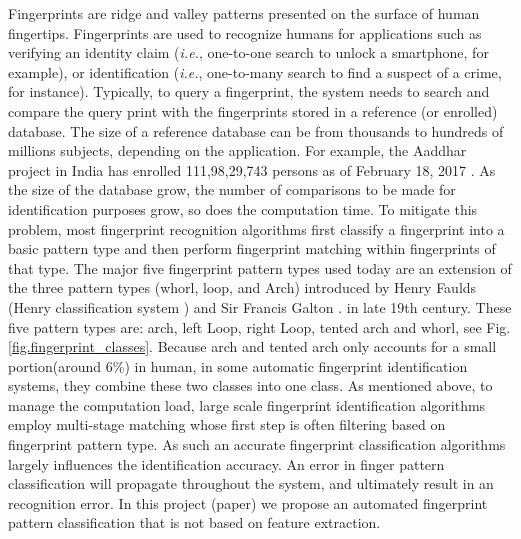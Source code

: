 

Fingerprints are ridge and valley patterns presented on the surface of human fingertips.
%
Fingerprints are used to recognize humans for applications such as verifying an identity claim (\textit{i.e.}, one-to-one search to  unlock a smartphone, for example), or identification (\textit{i.e.}, one-to-many search to find a suspect of a crime, for instance).
%
Typically, to query a fingerprint, the system needs to search and compare the query print with the fingerprints stored in a reference (or enrolled) database.  The size of a reference database can be from thousands to hundreds of millions subjects, depending on the application. For example, the Aaddhar project in India has enrolled 111,98,29,743 persons as of February 18, 2017 \cite{aaddhar}. 
%
As the size of the database grow, the number of comparisons to be made for identification purposes grow, so does the computation time.
%
To mitigate this problem, most fingerprint recognition algorithms first classify a fingerprint into a basic pattern type and then perform fingerprint matching within fingerprints of that type.
%
The major five fingerprint pattern types used today are an extension of the three pattern types (whorl, loop, and Arch) introduced by Henry Faulds (Henry classification system \cite{henry1905classification}) and Sir Francis Galton \cite{galton1892}. in late 19th century. These five pattern types are: arch, left Loop, right Loop, tented arch and whorl, see Fig.\ref{fig.fingerprint_classes}.  
%
Because arch and tented arch only accounts for a small portion(around 6\%) in human, in some automatic fingerprint identification systems, they combine these two classes into one class. 
%
As mentioned above, to manage the computation load, large scale fingerprint identification algorithms employ multi-stage matching whose first step is often filtering based on fingerprint pattern type. As such an accurate fingerprint classification algorithms largely influences the identification accuracy. An error in finger pattern classification will propagate throughout the system, and ultimately result in an recognition error. In this project (paper) we propose an automated fingerprint pattern classification that is not based on feature extraction.

